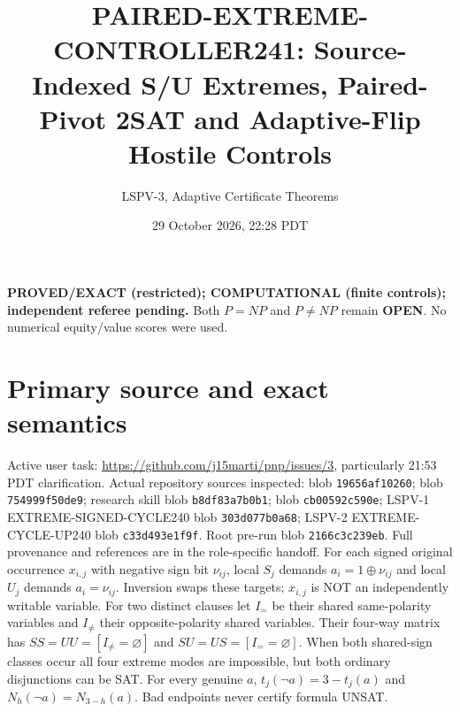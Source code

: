 \documentclass[11pt]{article}
\title{PAIRED-EXTREME-CONTROLLER241: Source-Indexed S/U Extremes,
Paired-Pivot 2SAT and Adaptive-Flip Hostile Controls}
\author{LSPV-3, Adaptive Certificate Theorems}
\date{29 October 2026, 22:28 PDT}
\begin{document}
\maketitle
\noindent\textbf{PROVED/EXACT (restricted); COMPUTATIONAL (finite controls);
independent referee pending.} Both $P=NP$ and $P\ne NP$ remain \textbf{OPEN}.
No numerical equity/value scores were used.
\section{Primary source and exact semantics}
Active user task: \url{https://github.com/j15marti/pnp/issues/3},
particularly 21:53 PDT clarification. Actual repository sources inspected:
 blob \texttt{19656af10260};
 blob \texttt{754999f50de9};
research skill blob \texttt{b8df83a7b0b1};
 blob \texttt{cb00592c590e};
LSPV-1 EXTREME-SIGNED-CYCLE240 blob \texttt{303d077b0a68};
LSPV-2 EXTREME-CYCLE-UP240 blob \texttt{c33d493e1f9f}.
Root  pre-run blob \texttt{2166c3c239eb}.
Full provenance and references are in the role-specific handoff.
For each signed original occurrence $x_{i,j}$ with negative sign bit
$\nu_{ij}$, local $S_j$ demands $a_i=1\oplus\nu_{ij}$
and local $U_j$ demands $a_i=\nu_{ij}$. Inversion swaps these targets;
$x_{i,j}$ is NOT an independently writable variable.
For two distinct clauses let $I_=$ be their shared same-polarity variables
and $I_{\ne}$ their opposite-polarity shared variables. Their four-way
matrix has $SS=UU=[I_{\ne}=\varnothing]$ and
$SU=US=[I_==\varnothing]$.
When both shared-sign classes occur all four extreme modes are impossible,
but both ordinary disjunctions can be SAT.
For every genuine $a$, $t_j(\neg a)=3-t_j(a)$ and
$N_h(\neg a)=N_{3-h}(a)$. Bad endpoints never certify formula UNSAT.
\end{document}
